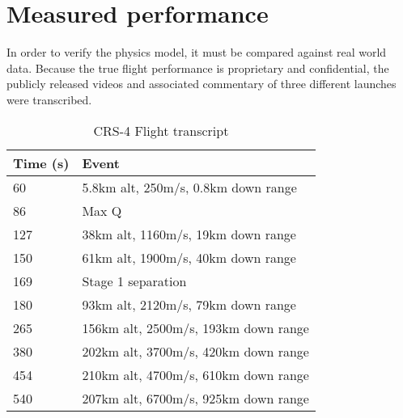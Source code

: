 \section{Measured performance}

In order to verify the physics model, it must be compared against real world data. Because the true flight performance is proprietary and confidential, the publicly released videos and associated commentary of three different launches were transcribed. 

\begin{table}[!htb]
\centering
\begin{tabular}{|l|l|}
\hline
\rowcolor[HTML]{C0C0C0} 
Time (s) & Event                                \\ \hline
60       & 5.8km alt, 250m/s, 0.8km down range  \\ \hline
\rowcolor[HTML]{EFEFEF} 
86       & Max Q                                \\ \hline
127      & 38km alt, 1160m/s, 19km down range   \\ \hline
\rowcolor[HTML]{EFEFEF} 
150      & 61km alt, 1900m/s, 40km down range   \\ \hline
169      & Stage 1 separation                   \\ \hline
\rowcolor[HTML]{EFEFEF} 
180      & 93km alt, 2120m/s, 79km down range   \\ \hline
265      & 156km alt, 2500m/s, 193km down range \\ \hline
\rowcolor[HTML]{EFEFEF} 
380     & 202km alt, 3700m/s, 420km down range \\ \hline
454      & 210km alt, 4700m/s, 610km down range \\ \hline
\rowcolor[HTML]{EFEFEF} 
540      & 207km alt, 6700m/s, 925km down range \\ \hline
\end{tabular}
\caption{CRS-4 Flight transcript \cite{CRS4}}
\label{tab:CRS4}
\end{table}

